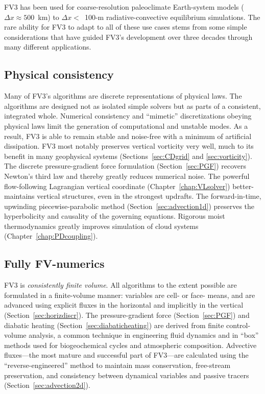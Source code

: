 \documentclass[10pt,letterpaper,margin=1in]{memoir}
\begin{document}
FV3 has been used for coarse-resolution paleoclimate Earth-system models ($\Delta x\approx 500$~km) to $\Delta x<$~100-m  radiative-convective equilibrium simulations. The rare ability for FV3 to adapt to all of these use cases stems from some simple considerations that have guided FV3's development over three decades through many different applications. 

\subsection{Physical consistency} Many of FV3's algorithms are discrete representations of physical laws. The algorithms are designed not as isolated simple solvers but as parts of a consistent, integrated whole. Numerical consistency and ``mimetic'' discretizations obeying physical laws limit the generation of computational and unstable modes. As a result, FV3 is able to remain stable and noise-free with a minimum of artificial dissipation. FV3 most notably preserves vertical vorticity very well, much to its benefit in many geophysical systems (Sections~\ref{sec:CDgrid} and \ref{sec:vorticity}). The discrete pressure-gradient force formulation (Section~\ref{sec:PGF}) recovers Newton's third law and thereby greatly reduces numerical noise. The powerful flow-following Lagrangian vertical coordinate (Chapter~\ref{chap:VLsolver}) better-maintains vertical structures, even in the strongest updrafts. The forward-in-time, upwinding piecewise-parabolic method (Section~\ref{sec:advection1d}) preserves the hyperbolicity and causality of the governing equations. Rigorous moist thermodynamics greatly improves simulation of cloud systems (Chapter~\ref{chap:PDcoupling}).
  
\subsection{Fully FV-numerics} FV3 is \textit{consistently finite volume}. All algorithms to the extent possible are formulated in a finite-volume manner: variables are cell- or face- means, and are advanced using explicit fluxes in the horizontal and implicitly in the vertical (Section~\ref{sec:horizdiscr}). The pressure-gradient force (Section~\ref{sec:PGF}) and diabatic heating (Section~\ref{sec:diabaticheating}) are derived from finite control-volume analysis, a common technique in engineering fluid dynamics and in ``box'' methods used for biogeochemical cycles and atmospheric composition. Advective fluxes---the most mature and successful part of FV3---are calculated using the  \citet{LR96} ``reverse-engineered'' method to maintain mass conservation, free-stream preservation, and consistency between dynamical variables and passive tracers (Section~\ref{sec:advection2d}). 
  
\end{document}
